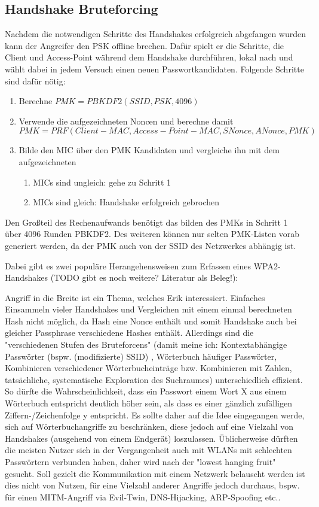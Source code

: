 \subsection{Handshake Bruteforcing}
Nachdem die notwendigen Schritte des Handshakes erfolgreich abgefangen wurden kann der Angreifer den PSK offline brechen.
Dafür spielt er die Schritte, die Client und Access-Point während dem Handshake durchführen, lokal nach und wählt dabei in jedem Versuch einen neuen Passwortkandidaten.
Folgende Schritte sind dafür nötig:
\begin{enumerate}
	\item Berechne $PMK = PBKDF2(SSID, PSK, 4096)$
	\item Verwende die aufgezeichneten Noncen und berechne damit \\$PMK = PRF(Client-MAC, Access-Point-MAC, SNonce, ANonce, PMK)$
	\item Bilde den MIC über den PMK Kandidaten und vergleiche ihn mit dem aufgezeichneten
	\begin{enumerate}
		\item MICs sind ungleich: gehe zu Schritt 1
		\item MICs sind gleich: Handshake erfolgreich gebrochen
	\end{enumerate}
\end{enumerate}
Den Großteil des Rechenaufwands benötigt das bilden des PMKs in Schritt 1 über 4096 Runden PBKDF2.
Des weiteren können nur selten PMK-Listen vorab generiert werden, da der PMK auch von der SSID des Netzwerkes abhängig ist.


Dabei gibt es zwei populäre Herangehensweisen zum Erfassen eines WPA2-Handshakes (TODO gibt es noch weitere? Literatur als Beleg!): 

Angriff in die Breite ist ein Thema, welches Erik interessiert. Einfaches Einsammeln vieler Handshakes und Vergleichen mit einem einmal berechneten Hash nicht möglich, da Hash eine Nonce enthält und somit Handshake auch bei gleicher Passphrase verschiedene Hashes enthält. Allerdings sind die "verschiedenen Stufen des Bruteforcens" (damit meine ich: Kontextabhängige Passwörter (bspw. (modifizierte) SSID) , Wörterbuch häufiger Passwörter, Kombinieren verschiedener Wörterbucheinträge bzw. Kombinieren mit Zahlen, tatsächliche, systematische Exploration des Suchraumes) unterschiedlich effizient. So dürfte die Wahrscheinlichkeit, dass ein Passwort einem Wort X aus einem Wörterbuch entspricht deutlich höher sein, als dass es einer gänzlich zufälligen Ziffern-/Zeichenfolge y entspricht. Es sollte daher auf die Idee eingegangen werde, sich auf Wörterbuchangriffe zu beschränken, diese jedoch auf eine Vielzahl von Handshakes (ausgehend von einem Endgerät) loszulassen. Üblicherweise dürften die meisten Nutzer sich in der Vergangenheit auch mit WLANs mit schlechten Passwörtern verbunden haben, daher wird nach der "lowest hanging fruit" gesucht. Soll gezielt die Kommunikation mit einem Netzwerk belauscht werden ist dies nicht von Nutzen, für eine Vielzahl anderer Angriffe jedoch durchaus, bspw. für einen MITM-Angriff via Evil-Twin, DNS-Hijacking, ARP-Spoofing etc..